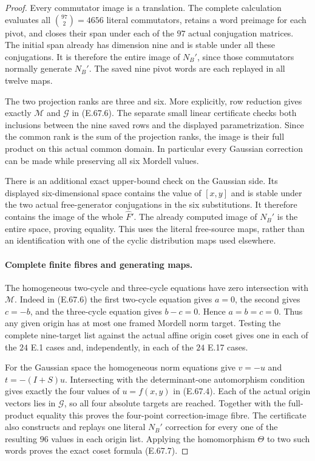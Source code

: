 \begin{proof}
Every commutator image is a translation. The complete
calculation evaluates all $\binom{97}{2}=4656$ literal
commutators, retains a word preimage for each pivot,
and closes their span under each of the $97$ actual
conjugation matrices. The initial span already has
dimension nine and is stable under all these conjugations.
It is therefore the entire image of $N_B'$, since those
commutators normally generate $N_B'$. The saved nine
pivot words are each replayed in all twelve maps.

The two projection ranks are three and six. More
explicitly, row reduction gives exactly
$\mathcal M$ and $\mathcal G$ in
\textup{(E.67.6)}. The separate small linear certificate
checks both inclusions between the nine saved rows and
the displayed parametrization. Since the common rank is
the sum of the projection ranks, the image is their
full product on this actual common domain. In particular
every Gaussian correction can be made while preserving
all six Mordell values.

There is an additional exact upper-bound check on the
Gaussian side. Its displayed six-dimensional space
contains the value of $[x,y]$ and is stable under the
two actual free-generator conjugations in the six
substitutions. It therefore contains the image of the
whole $\widehat F'$. The already computed image of
$N_B'$ is the entire space, proving equality. This
uses the literal free-source maps, rather than an
identification with one of the cyclic distribution
maps used elsewhere.

\paragraph{Complete finite fibres and generating maps.}
The homogeneous two-cycle and three-cycle equations
have zero intersection with $\mathcal M$. Indeed in
\textup{(E.67.6)} the first two-cycle equation gives
$a=0$, the second gives $c=-b$, and the three-cycle
equation gives $b-c=0$. Hence $a=b=c=0$. Thus any
given origin has at most one framed Mordell norm
target. Testing the complete nine-target list against
the actual affine origin coset gives one in each of
the $24$ E.1 cases and, independently, in each of the
$24$ E.17 cases.

For the Gaussian space the homogeneous norm equations
give $v=-u$ and $t=-(I+S)u$. Intersecting with the
determinant-one automorphism condition gives exactly
the four values of $u=f(x,y)$ in
\textup{(E.67.4)}. Each of the actual origin vectors
lies in $\mathcal G$, so all four absolute targets
are reached. Together with the full-product equality
this proves the four-point correction-image fibre.
The certificate also constructs and replays one
literal $N_B'$ correction for every one of the
resulting $96$ values in each origin list. Applying
the homomorphism $\Theta$ to two such words proves
the exact coset formula \textup{(E.67.7)}.


\end{proof}
